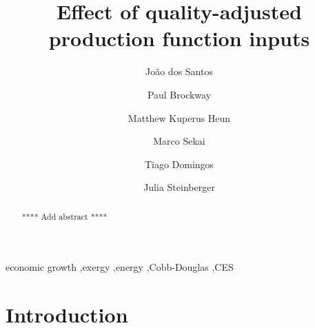 \documentclass[preprint,authoryear,12pt]{elsarticle}\usepackage[]{graphicx}\usepackage[]{color}
\begin{document}
\begin{frontmatter}



\title{Effect of quality-adjusted production function inputs}


\author[IST]{Jo\~{a}o dos Santos}
\author[Leeds]{Paul Brockway}
\author[CalvinEngr]{Matthew Kuperus Heun}
\author[Leeds]{Marco Sekai}
\author[IST]{Tiago Domingos}
\author[Leeds]{Julia Steinberger}

\address[IST]{IST, Lisbon, Portugal}
\address[Leeds]{Leeds University, Leeds, UK}
\address[CalvinEngr]{Engineering Department, Calvin College, Grand Rapids, MI 49546, USA}

\begin{abstract}
**** Add abstract ****
\end{abstract}

\begin{keyword}
economic growth \sep exergy \sep energy \sep Cobb-Douglas \sep CES
\end{keyword}

\end{frontmatter}



\section{Introduction} 
\label{sec:Introduction}
\end{document}

